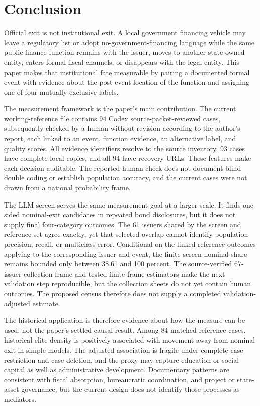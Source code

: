 \section{Conclusion}

Official exit is not institutional exit. A local government financing vehicle
may leave a regulatory list or adopt no-government-financing language while the
same public-finance function remains with the issuer, moves to another
state-owned entity, enters formal fiscal channels, or disappears with the legal
entity. This paper makes that institutional fate measurable by pairing a
documented formal event with evidence about the post-event location of the
function and assigning one of four mutually exclusive labels.

The measurement framework is the paper's main contribution. The current
working-reference file contains 94 Codex source-packet-reviewed cases,
subsequently checked by a human without revision according to the author's
report, each linked to an event,
function evidence, an alternative label, and quality scores. All evidence
identifiers resolve to the source inventory, 93 cases have complete local
copies, and all 94 have recovery URLs. These features make each decision
auditable. The reported human check does not document blind double coding or
establish population accuracy, and the current cases were not drawn from a
national probability frame.

The LLM screen serves the same measurement goal at a larger scale. It finds
one-sided nominal-exit candidates in repeated bond disclosures, but it does not
supply final four-category outcomes. The 61 issuers shared by the screen and
reference set agree exactly, yet that selected overlap cannot identify
population precision, recall, or multiclass error. Conditional on the linked
reference outcomes applying to the corresponding issuer and event, the
finite-screen nominal share remains bounded only between 38.61 and 100 percent.
The source-verified 67-issuer collection frame and tested finite-frame
estimators make the next validation step reproducible, but the collection
sheets do not yet contain human outcomes. The proposed census therefore does
not supply a completed validation-adjusted estimate.

The historical application is therefore evidence about how the measure can be
used, not the paper's settled causal result. Among 84 matched reference cases,
historical elite density is positively associated with movement away from
nominal exit in simple models. The adjusted association is fragile under
complete-case restriction and case deletion, and the proxy may capture
education or social capital as well as administrative development.
Documentary patterns are consistent with fiscal absorption, bureaucratic
coordination, and project or state-asset governance, but the current design
does not identify those processes as mediators.


